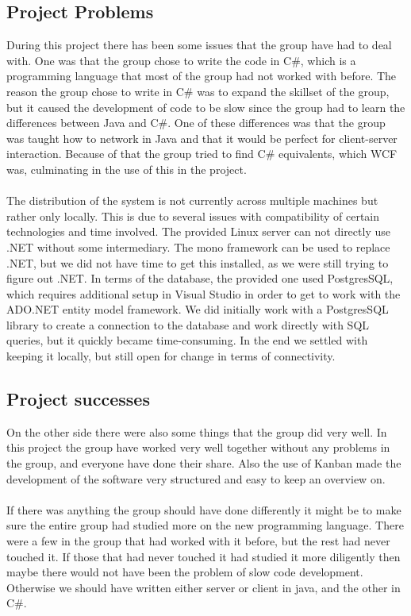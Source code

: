 	\subsection{Project Problems}
	During this project there has been some issues that the group have had to
   deal with. One was that the group chose to write the code in C\#, which is
    a programming language that most of the group had not worked with before.
    The reason the group chose to write in C\# was to expand the skillset of
     the group, but it caused the development of code to be slow since the
     group had to learn the differences between Java and C\#. One of these
      differences was that the group was taught how to network in Java and
      that it would be perfect for client-server interaction. Because of that
      the group tried to find C\# equivalents, which WCF was, culminating in
       the use of this in the project.
	\\
	\\
	The distribution of the system is not currently across multiple machines but
   rather only locally. This is due to several issues with compatibility of
   certain technologies and time involved. The provided Linux server can not
    directly use .NET without some intermediary. The mono framework can be
    used to replace .NET, but we did not have time to get this installed, as
    we were still trying to figure out .NET. In terms of the database, the
     provided one used PostgresSQL, which requires additional setup in Visual
      Studio in order to get to work with the ADO.NET entity model framework.
       We did initially work with a PostgresSQL library to create a connection
       to the database and work directly with SQL queries, but it quickly
       became time-consuming. In the end we settled with keeping it locally,
        but still open for change in terms of connectivity.
	\\
	\subsection{Project successes}
	On the other side there were also some things that the group did very well.
   In this project the group have worked very well together without any
   problems in the group, and everyone have done their share. Also the use
    of Kanban made the development of the software very structured and easy
     to keep an overview on.
	\\
	\\
If there was anything the group should have done differently it might be to
 make sure the entire group had studied more on the new programming language.
  There were a few in the group that had worked with it before, but the rest
  had never touched it. If those that had never touched it had studied it more
   diligently then maybe there would not have been the problem of slow code
    development. Otherwise we should have written either server or client in
    java, and the other in C\#.
